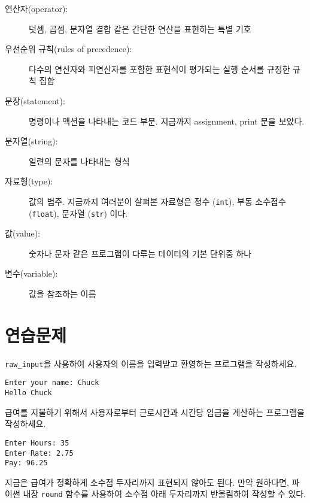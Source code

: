 \begin{description}
\item[연산자(operator):] 덧셈, 곱셈, 문자열 결합 같은 간단한 연산을 표현하는 특별 기호

\item[우선순위 규칙(rules of precedence):] 다수의 연산자와 피연산자를 포함한 표현식이 평가되는 실행 순서를 규정한 규칙 집합

\item[문장(statement):] 명령이나 액션을 나타내는 코드 부문. 지금까지 assignment, print 문을 보았다.

\item[문자열(string):] 일련의 문자를 나타내는 형식

\item[자료형(type):] 값의 범주. 지금까지 여러분이 살펴본 자료형은 정수 ({\tt int}), 부동 소수점수 ({\tt float}), 문자열 ({\tt str}) 이다.

\item[값(value):] 숫자나 문자 같은 프로그램이 다루는 데이터의 기본 단위중 하나

\item[변수(variable):] 값을 참조하는 이름

\end{description}

\section{연습문제}

\begin{ex}
\verb"raw_input"을 사용하여 사용자의 이름을 입력받고 환영하는 프로그램을 작성하세요.

\begin{verbatim}
Enter your name: Chuck
Hello Chuck
\end{verbatim}

\end{ex}

\begin{ex}
급여를 지불하기 위해서 사용자로부터 근로시간과 시간당 임금을 계산하는 프로그램을 작성하세요.
\begin{verbatim}
Enter Hours: 35
Enter Rate: 2.75
Pay: 96.25
\end{verbatim}
\end{ex}
%
지금은 급여가 정확하게 소수점 두자리까지 표현되지 않아도 된다. 
만약 원하다면, 파이썬 내장 {\tt round} 함수를 사용하여 소수점 아래 두자리까지 반올림하여 작성할 수 있다.


